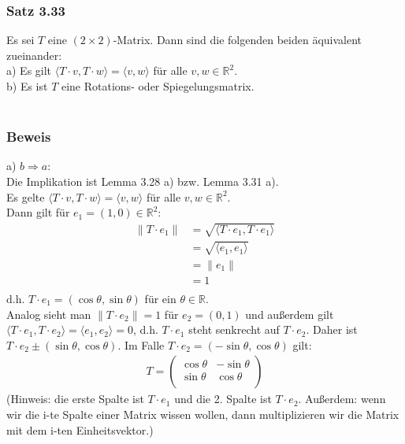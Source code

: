 \documentclass{article}
\begin{document}
\subsubsection*{Satz 3.33}
Es sei $T$ eine $(2 \times 2)$-Matrix. Dann sind die folgenden beiden äquivalent zueinander: \\
a) Es gilt $\langle T \cdot v, T \cdot w \rangle = \langle v,w \rangle$ für alle $v,w \in \mathbb{R}^2$. \\
b) Es ist $T$ eine Rotations- oder Spiegelungsmatrix. \\
\\
\subsubsection*{Beweis}
a) $b \Rightarrow a$: \\
Die Implikation ist Lemma 3.28 a) bzw. Lemma 3.31 a). \\
Es gelte $\langle T \cdot v, T \cdot w \rangle = \langle v,w \rangle$ für alle $v,w \in \mathbb{R}^2$. \\
Dann gilt für $e_1 = (1,0) \in \mathbb{R}^2$: \\
\begin{align*}
    \|T \cdot e_1\| &= \sqrt{\langle T \cdot e_1, T \cdot e_1 \rangle} \\
    &= \sqrt{\langle e_1, e_1 \rangle} \\
    &= \|e_1\| \\
    &= 1 \\
\end{align*}
d.h. $T \cdot e_1 = (\cos \theta, \sin \theta)$ für ein $\theta \in \mathbb{R}$. \\
Analog sieht man $\|T \cdot e_2\| = 1$ für $e_2 = (0,1)$ und außerdem gilt $\langle T \cdot e_1, T \cdot e_2 \rangle = \langle e_1, e_2 \rangle = 0$, d.h. $T \cdot e_1$ steht senkrecht auf $T \cdot e_2$. 
Daher ist $T \cdot e_2 \pm (\sin \theta, \cos \theta)$. Im Falle $T \cdot e_2 = (-\sin \theta, \cos \theta)$ gilt: \\
\begin{align*}
    T = \begin{pmatrix}
        \cos \theta & -\sin \theta \\
        \sin \theta & \cos \theta \\
    \end{pmatrix}
\end{align*}
(Hinweis: die erste Spalte ist $T \cdot e_1$ und die 2. Spalte ist $T \cdot e_2$. Außerdem: wenn wir die i-te Spalte einer Matrix wissen wollen, dann multiplizieren wir die Matrix mit dem i-ten Einheitsvektor.)
\end{document}
